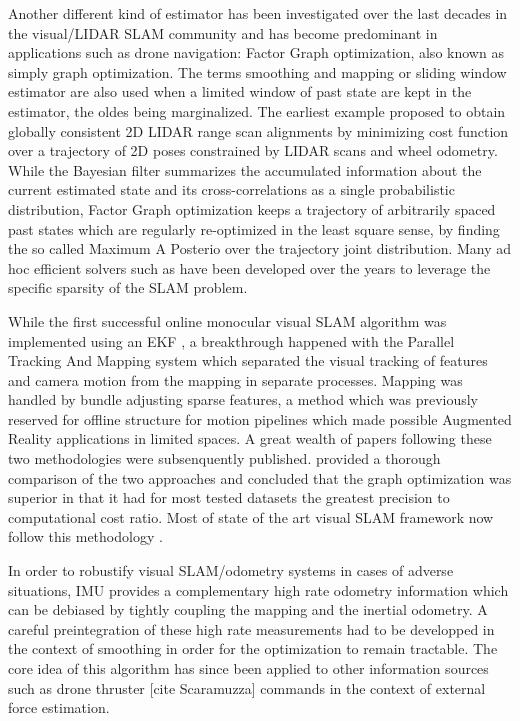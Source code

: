 Another different kind of estimator has been investigated over the last decades in the visual/LIDAR SLAM community and has become predominant in applications
such as drone navigation: Factor Graph optimization, also known as simply graph optimization. The terms smoothing and mapping or sliding window estimator are
also used when a limited window of past state are kept in the estimator, the oldes being marginalized. The earliest example \cite{lu1997globally} 
proposed to obtain globally consistent 2D LIDAR range scan alignments by minimizing cost function over a trajectory of 2D poses constrained by LIDAR scans and wheel odometry.
While the Bayesian filter summarizes the accumulated information about the current estimated state and its cross-correlations as a single probabilistic distribution, 
Factor Graph optimization keeps a trajectory of arbitrarily spaced past states which are regularly re-optimized in the least square sense, by finding the so called 
Maximum A Posterio over the trajectory joint distribution. Many ad hoc efficient solvers such as\cite{grisetti2011g2o, dellaert2012factor, ila2017slam++, ceres-solver} have been developed 
over the years to leverage the specific sparsity of the SLAM problem.

While the first successful online monocular visual SLAM algorithm was implemented using an EKF \cite{davison2007monoslam}, a breakthrough happened with the 
Parallel Tracking And Mapping system \cite{klein2009parallel} which separated the visual tracking of features and camera motion from the 
mapping in separate processes. Mapping was handled by bundle adjusting sparse features, a method which was previously reserved for offline 
structure for motion pipelines \cite{triggs1999bundle} which made possible Augmented Reality applications in limited spaces. 
A great wealth of papers following these two methodologies were subsenquently published. \cite{strasdat2012visual} provided a thorough comparison 
of the two approaches and concluded that the graph optimization was superior in that it had for most tested datasets the greatest precision to 
computational cost ratio. Most of state of the art visual SLAM framework now follow this methodology \cite{forster2017-TRO, mur2015orb, qin2018vins, leutenegger2015keyframe, ferrera2021ov}.

In order to robustify visual SLAM/odometry systems in cases of adverse situations, IMU provides a complementary high rate odometry information which can 
be debiased by tightly coupling the mapping and the inertial odometry. A careful preintegration \cite{lupton-09,forster2017-TRO} of these high 
rate measurements had to be developped in the context of smoothing in order for the optimization to remain tractable. The core idea of this algorithm has 
since been applied to other information sources such as drone thruster [cite Scaramuzza] commands in the context of external force estimation.

